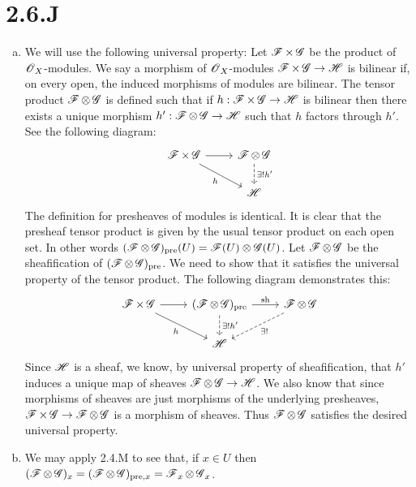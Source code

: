 \documentclass{article}
\begin{document}
\section*{2.6.J}
\begin{enumerate}[a.]
    \item
          We will use the following universal property: Let $\operatorname{\mathscr{F}} \times \operatorname{\mathscr{G}}$ be the
          product of $\operatorname{\mathscr{O}}_X$-modules. We say a morphism of
          $\operatorname{\mathscr{O}}_X$-modules $\operatorname{\mathscr{F}} \times \operatorname{\mathscr{G}} \to \operatorname{\mathscr{H}}$ is bilinear if, on every
          open, the induced morphisms of modules are bilinear. The tensor product
          $\operatorname{\mathscr{F}} \otimes \operatorname{\mathscr{G}}$ is defined such that if $h: \operatorname{\mathscr{F}} \times \operatorname{\mathscr{G}} \to \operatorname{\mathscr{H}}$ is
          bilinear then there exists a unique morphism $h': \operatorname{\mathscr{F}} \otimes \operatorname{\mathscr{G}} \to \operatorname{\mathscr{H}}$ such that
          $h$ factors through $h'$. See the
          following diagram: \[\begin{tikzcd}
                  {\Fsh \times \Gsh} & {\Fsh \otimes \Gsh} \\
                                     & {\Hsh}
                  \arrow["{\exists! h'}", dashed, from=1-2, to=2-2]
                  \arrow["h"', from=1-1, to=2-2]
                  \arrow[from=1-1, to=1-2]
              \end{tikzcd}\] The definition for presheaves of
          modules is identical. It is clear that the presheaf tensor product is given by
          the usual tensor product on each open set. In other words
          $(\operatorname{\mathscr{F}} \otimes \operatorname{\mathscr{G}})_\text{pre}(U)=\operatorname{\mathscr{F}}(U) \otimes
              \operatorname{\mathscr{G}}(U)$. Let $\operatorname{\mathscr{F}} \otimes \operatorname{\mathscr{G}}$ be the sheafification of
          $(\operatorname{\mathscr{F}} \otimes \operatorname{\mathscr{G}})_\text{pre}$. We need to show that it satisfies the universal
          property of the tensor product. The following diagram demonstrates this:
          \[\begin{tikzcd}
                  {\Fsh \times \Gsh} & {(\Fsh \otimes \Gsh)_\text{pre}} & {\Fsh \otimes \Gsh} \\
                                     & {\Hsh}
                  \arrow["{\exists! h'}", dashed, from=1-2, to=2-2]
                  \arrow["h"', from=1-1, to=2-2]
                  \arrow[from=1-1, to=1-2]
                  \arrow["{\text{sh}}", from=1-2, to=1-3]
                  \arrow["{\exists!}", dashed, from=1-3, to=2-2]
              \end{tikzcd}\] Since $\operatorname{\mathscr{H}}$ is a sheaf, we know, by
          universal property of sheafification, that $h'$ induces a
          unique map of sheaves $\operatorname{\mathscr{F}} \otimes \operatorname{\mathscr{G}} \to \operatorname{\mathscr{H}}$. We also know that since morphisms
          of sheaves are just morphisms of the underlying presheaves,
          $\operatorname{\mathscr{F}} \times \operatorname{\mathscr{G}} \to \operatorname{\mathscr{F}} \otimes \operatorname{\mathscr{G}}$ is a morphism of sheaves. Thus $\operatorname{\mathscr{F}} \otimes \operatorname{\mathscr{G}}$
          satisfies the desired universal property.
    \item We may apply 2.4.M to see that, if $x \in U$ then
          $(\operatorname{\mathscr{F}} \otimes \operatorname{\mathscr{G}})_x = (\operatorname{\mathscr{F}} \otimes
              \operatorname{\mathscr{G}})_{\text{pre},x}=\operatorname{\mathscr{F}}_x \otimes \operatorname{\mathscr{G}}_x$.
\end{enumerate}
\end{document}
